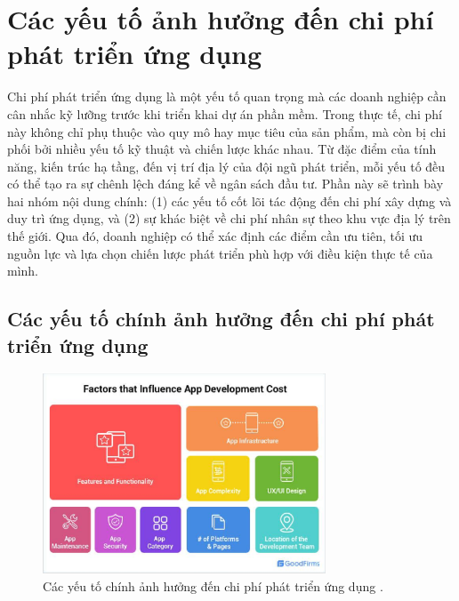 \section{Các yếu tố ảnh hưởng đến chi phí phát triển ứng dụng}
\begin{flushleft}
  \hspace*{0.8cm}Chi phí phát triển ứng dụng là một yếu tố quan trọng mà các doanh nghiệp cần cân nhắc kỹ lưỡng trước khi triển khai dự án phần mềm. Trong thực tế, chi phí này không chỉ phụ thuộc vào quy mô hay mục tiêu của sản phẩm, mà còn bị chi phối bởi nhiều yếu tố kỹ thuật và chiến lược khác nhau. Từ đặc điểm của tính năng, kiến trúc hạ tầng, đến vị trí địa lý của đội ngũ phát triển, mỗi yếu tố đều có thể tạo ra sự chênh lệch đáng kể về ngân sách đầu tư. Phần này sẽ trình bày hai nhóm nội dung chính: (1) các yếu tố cốt lõi tác động đến chi phí xây dựng và duy trì ứng dụng, và (2) sự khác biệt về chi phí nhân sự theo khu vực địa lý trên thế giới. Qua đó, doanh nghiệp có thể xác định các điểm cần ưu tiên, tối ưu nguồn lực và lựa chọn chiến lược phát triển phù hợp với điều kiện thực tế của mình.
  \end{flushleft}
  
  
\subsection{Các yếu tố chính ảnh hưởng đến chi phí phát triển ứng dụng}
\renewcommand{\labelitemi}{--}  

  \begin{figure}[H]
    \centering
    \includegraphics[width=0.75\textwidth]{images/appCosst.png}
    \caption{Các yếu tố chính ảnh hưởng đến chi phí phát triển ứng dụng \cite{goodfirmsAppCost}.}
    \label{fig:fig20}
  \end{figure}

